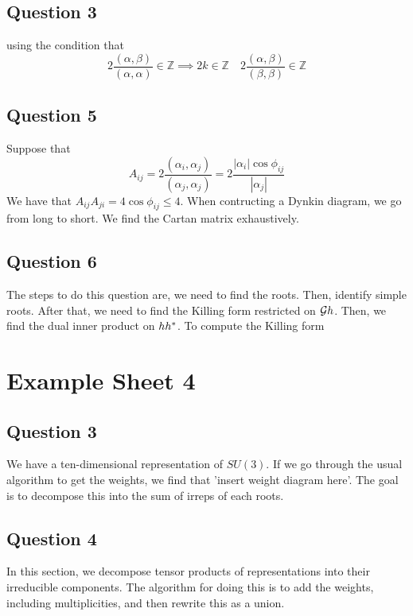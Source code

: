 \subsection{Question 3} 
using the condition that 
\[
	2 \frac{\left( \alpha, \beta  \right)  }{ \left( \alpha, \alpha  \right)  } \in \mathbb{ Z}  \implies 2k \in \mathbb{ Z} \quad 2 \frac{  \left( \alpha, \beta   \right)   }{\left( \beta , \beta  \right)  } \in \mathbb{ Z} 
\] 

\subsection{Question 5} 
Suppose that 
\[
	A _{ ij }  = 2 \frac{ \left( \alpha _ i, \alpha _ j   \right)  }{ \left( \alpha _ j , \alpha _ j  \right)  }
	 = 2 \frac{| \alpha _ i | \cos \phi _{ ij } }{ | \alpha _ j | } 
\] We have that $ A_{ ij } A_{ ji }  =  4 \cos \phi _{ ij } \leq 4 $. 
When contructing a Dynkin diagram, we go from long to short. 
We find the Cartan matrix exhaustively. 

\subsection{Question 6} 
The steps to do this question are, 
we need to find the roots. Then, identify simple roots. 
After that, we need to find the Killing form 
restricted on $ \mathcal{ G } h $. Then, we find 
the dual inner product on $ h h ^ * $. 
To compute the Killing form 

\pagebreak 
\section{Example Sheet 4}

\subsection{Question 3}
We have a ten-dimensional representation 
of $ SU ( 3 ) $. 
If we go through the usual algorithm 
to get the weights, we find that 
'insert weight diagram here'. 
The goal is to decompose this 
into the sum of irreps of each roots. 


\subsection{Question 4} 
In this section, we decompose 
tensor products of representations into 
their irreducible components. 
The algorithm for doing this is to add the weights, 
including multiplicities, and then rewrite 
this as a union.


